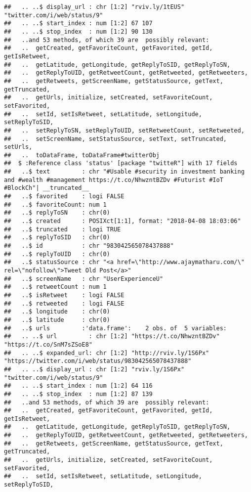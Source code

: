 \documentclass[]{article}
\begin{document}
\begin{verbatim}
##   .. ..$ display_url : chr [1:2] "rviv.ly/1tEUS" "twitter.com/i/web/status/9"
##   .. ..$ start_index : num [1:2] 67 107
##   .. ..$ stop_index  : num [1:2] 90 130
##   ..and 53 methods, of which 39 are  possibly relevant:
##   ..  getCreated, getFavoriteCount, getFavorited, getId, getIsRetweet,
##   ..  getLatitude, getLongitude, getReplyToSID, getReplyToSN,
##   ..  getReplyToUID, getRetweetCount, getRetweeted, getRetweeters,
##   ..  getRetweets, getScreenName, getStatusSource, getText, getTruncated,
##   ..  getUrls, initialize, setCreated, setFavoriteCount, setFavorited,
##   ..  setId, setIsRetweet, setLatitude, setLongitude, setReplyToSID,
##   ..  setReplyToSN, setReplyToUID, setRetweetCount, setRetweeted,
##   ..  setScreenName, setStatusSource, setText, setTruncated, setUrls,
##   ..  toDataFrame, toDataFrame#twitterObj
##  $ :Reference class 'status' [package "twitteR"] with 17 fields
##   ..$ text         : chr "#Usable #security in investment banking and #wealth #management https://t.co/NhwzntBZDv #Futurist #IoT #BlockCh"| __truncated__
##   ..$ favorited    : logi FALSE
##   ..$ favoriteCount: num 1
##   ..$ replyToSN    : chr(0) 
##   ..$ created      : POSIXct[1:1], format: "2018-04-08 18:03:06"
##   ..$ truncated    : logi TRUE
##   ..$ replyToSID   : chr(0) 
##   ..$ id           : chr "983042565078437888"
##   ..$ replyToUID   : chr(0) 
##   ..$ statusSource : chr "<a href=\"http://www.ajaymatharu.com/\" rel=\"nofollow\">Tweet Old Post</a>"
##   ..$ screenName   : chr "UserExperienceU"
##   ..$ retweetCount : num 1
##   ..$ isRetweet    : logi FALSE
##   ..$ retweeted    : logi FALSE
##   ..$ longitude    : chr(0) 
##   ..$ latitude     : chr(0) 
##   ..$ urls         :'data.frame':    2 obs. of  5 variables:
##   .. ..$ url         : chr [1:2] "https://t.co/NhwzntBZDv" "https://t.co/SnM7sZSoE8"
##   .. ..$ expanded_url: chr [1:2] "http://rviv.ly/1S6Px" "https://twitter.com/i/web/status/983042565078437888"
##   .. ..$ display_url : chr [1:2] "rviv.ly/1S6Px" "twitter.com/i/web/status/9"
##   .. ..$ start_index : num [1:2] 64 116
##   .. ..$ stop_index  : num [1:2] 87 139
##   ..and 53 methods, of which 39 are  possibly relevant:
##   ..  getCreated, getFavoriteCount, getFavorited, getId, getIsRetweet,
##   ..  getLatitude, getLongitude, getReplyToSID, getReplyToSN,
##   ..  getReplyToUID, getRetweetCount, getRetweeted, getRetweeters,
##   ..  getRetweets, getScreenName, getStatusSource, getText, getTruncated,
##   ..  getUrls, initialize, setCreated, setFavoriteCount, setFavorited,
##   ..  setId, setIsRetweet, setLatitude, setLongitude, setReplyToSID,

\end{verbatim}
\end{document}
